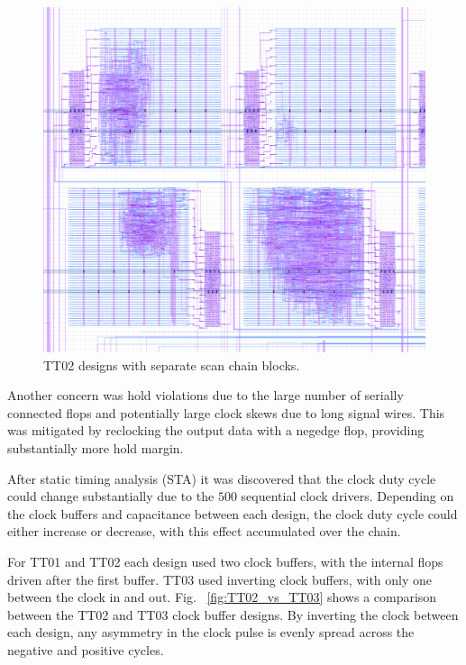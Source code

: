 \begin{figure}[!t]
\centering
\includegraphics[width=\columnwidth]{./Figs/tt02_gds_zoom.png}
\caption{TT02 designs with separate scan chain blocks.}
\label{fig:TT02_separate_scan_blocks}
\end{figure}


Another concern was hold violations due to the large number of serially connected flops and potentially large clock skews due to long signal wires.  This was mitigated by reclocking the output data with a negedge flop, providing substantially more hold margin.

After static timing analysis (STA) it was discovered that the clock duty cycle could change substantially due to the \(500\) sequential clock drivers. Depending on the clock buffers and capacitance between each design, the clock duty cycle could either increase or decrease, with this effect accumulated over the chain.

For TT01 and TT02 each design used two clock buffers, with the internal flops driven after the first buffer.
TT03 used inverting clock buffers, with only one between the clock in and out. Fig. ~\ref{fig:TT02_vs_TT03} shows a comparison between the TT02 and TT03 clock buffer designs.  By inverting the clock between each design, any asymmetry in the clock pulse is evenly spread across the negative and positive cycles.

